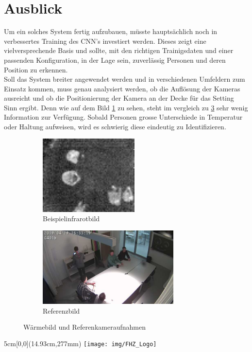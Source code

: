 \documentclass[
	a4paper
]{scrartcl}
\begin{document}
\section{Ausblick}
Um ein solches System fertig aufzubauen, müsste hauptsächlich noch in verbessertes Training des CNN's investiert werden. Dieses zeigt eine vielversprechende Basis und sollte, mit den richtigen Trainigsdaten und einer passenden Konfiguration, in der Lage sein, zuverlässig Personen und deren Position zu erkennen.\\
Soll das System breiter angewendet werden und in verschiedenen Umfeldern zum Einsatz kommen, muss genau analysiert werden, ob die Auflösung der Kameras ausreicht und ob die Positionierung der Kamera an der Decke für das Setting Sinn ergibt. Denn wie auf dem Bild \ref{fig:irexample} zu sehen, steht im vergleich zu \ref{fig:refexample} sehr wenig Information zur Verfügung. Sobald Personen grosse Unterschiede in Temperatur oder Haltung aufweisen, wird es schwierig diese eindeutig zu Identifizieren.

\begin{figure}[H]
	\begin{subfigure}{.5\linewidth}
		\centering
		\includegraphics[keepaspectratio, height=4cm]{exampleIRImage}
		\caption{Beispielinfrarotbild}
		\label{fig:irexample}
	\end{subfigure}
	\begin{subfigure}{.4\linewidth}
		\centering
		\includegraphics[keepaspectratio, height=4cm]{exampleGround}
		\caption{Referenzbild}
		\label{fig:refexample}
	\end{subfigure}
	\caption{Wärmebild und Referenkameraufnahmen}
\end{figure}

\vspace{0.5em}
\noindent
\begin{textblock*}{5cm}[0,0](14.93cm,277mm)
	\texttt{[image: img/FHZ\_Logo]}
\end{textblock*}
\end{document}
